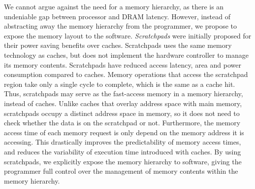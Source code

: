 We cannot argue against the need for a memory hierarchy, as there is an undeniable gap between processor and DRAM latency.
However, instead of abstracting away the memory hierarchy from the programmer, we propose to expose the memory layout to the software.  
\emph{Scratchpads} were initially proposed for their power saving benefits over caches.
Scratchpads uses the same memory technology as caches, but does not implement the hardware controller to manage its memory contents.
Scratchpads have reduced access latency, area and power consumption compared to caches. 
Memory operations that access the scratchpad region take only a single cycle to complete, which is the same as a cache hit.
Thus, scratchpads may serve as the fast-access memory in a memory hierarchy, instead of caches. 
Unlike caches that overlay address space with main memory, scratchpads occupy a distinct address space in memory, so it does not need to check whether the data is on the scratchpad or not. 
Furthermore, the memory access time of each memory request is only depend on the memory address it is accessing. 
This drastically improves the predictability of memory access times, and reduces the variability of execution time introduced with caches.  
By using scratchpads, we explicitly expose the memory hierarchy to software, giving the programmer full control over the management of memory contents within the memory hierarchy.

